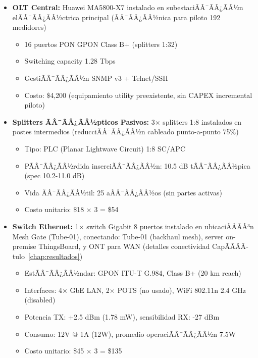 \begin{itemize}
    \item \textbf{OLT Central:} Huawei MA5800-X7 instalado en subestaciÃÂ¯ÃÂ¿ÃÂ½n elÃÂ¯ÃÂ¿ÃÂ½ctrica principal (ÃÂ¯ÃÂ¿ÃÂ½nica para piloto 192 medidores)
    \begin{itemize}
        \item 16 puertos PON GPON Class B+ (splitters 1:32)
        \item Switching capacity 1.28 Tbps
        \item GestiÃÂ¯ÃÂ¿ÃÂ½n SNMP v3 + Telnet/SSH
        \item Costo: \$4,200 (equipamiento utility preexistente, sin CAPEX incremental piloto)
    \end{itemize}
    
    \item \textbf{Splitters ÃÂ¯ÃÂ¿ÃÂ½pticos Pasivos:} 3$\times$ splitters 1:8 instalados en postes intermedios (reducciÃÂ¯ÃÂ¿ÃÂ½n cableado punto-a-punto 75\%)
    \begin{itemize}
        \item Tipo: PLC (Planar Lightwave Circuit) 1:8 SC/APC
        \item PÃÂ¯ÃÂ¿ÃÂ½rdida inserciÃÂ¯ÃÂ¿ÃÂ½n: 10.5 dB tÃÂ¯ÃÂ¿ÃÂ½pica (spec 10.2-11.0 dB)
        \item Vida ÃÂ¯ÃÂ¿ÃÂ½til: 25 aÃÂ¯ÃÂ¿ÃÂ½os (sin partes activas)
        \item Costo unitario: \$18 $\times$ 3 = \$54
    \end{itemize}
    
    \item \textbf{Switch Ethernet:} 1$\times$ switch Gigabit 8 puertos instalado en ubicaciÃÂÃÂ³n Mesh Gate (Tube-01), conectando: Tube-01 (backhaul mesh), server on-premise ThingsBoard, y ONT para WAN (detalles conectividad CapÃÂÃÂ­tulo~\ref{chap:resultados})
    \begin{itemize}
        \item EstÃÂ¯ÃÂ¿ÃÂ½ndar: GPON ITU-T G.984, Class B+ (20 km reach)
        \item Interfaces: 4$\times$ GbE LAN, 2$\times$ POTS (no usado), WiFi 802.11n 2.4 GHz (disabled)
        \item Potencia TX: +2.5 dBm (1.78 mW), sensibilidad RX: -27 dBm
        \item Consumo: 12V @ 1A (12W), promedio operaciÃÂ¯ÃÂ¿ÃÂ½n 7.5W
        \item Costo unitario: \$45 $\times$ 3 = \$135
    \end{itemize}
    

\end{itemize}
